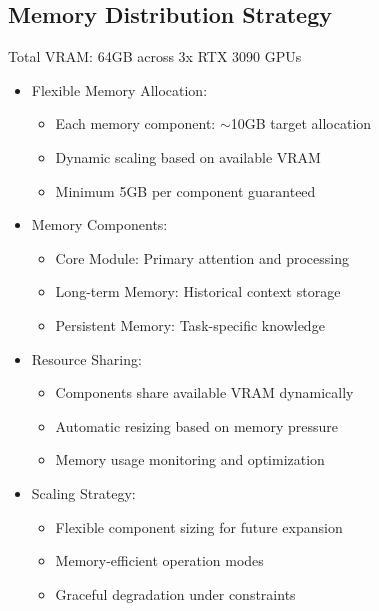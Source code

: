 \documentclass{article}
\begin{document}
\subsection{Memory Distribution Strategy}
Total VRAM: 64GB across 3x RTX 3090 GPUs
\begin{itemize}
    \item Flexible Memory Allocation:
    \begin{itemize}
        \item Each memory component: $\sim$10GB target allocation
        \item Dynamic scaling based on available VRAM
        \item Minimum 5GB per component guaranteed
    \end{itemize}
    \item Memory Components:
    \begin{itemize}
        \item Core Module: Primary attention and processing
        \item Long-term Memory: Historical context storage
        \item Persistent Memory: Task-specific knowledge
    \end{itemize}
    \item Resource Sharing:
    \begin{itemize}
        \item Components share available VRAM dynamically
        \item Automatic resizing based on memory pressure
        \item Memory usage monitoring and optimization
    \end{itemize}
    \item Scaling Strategy:
    \begin{itemize}
        \item Flexible component sizing for future expansion
        \item Memory-efficient operation modes
        \item Graceful degradation under constraints
    \end{itemize}
\end{itemize}
\end{document}
